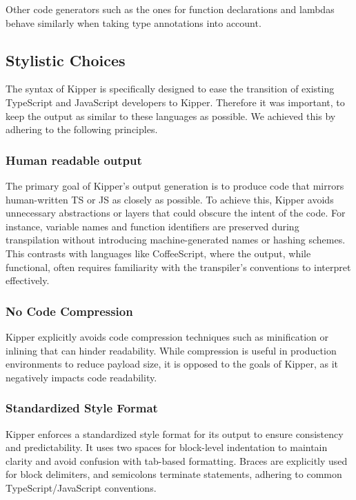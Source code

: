 Other code generators such as the ones for function declarations and lambdas behave similarly when taking type annotations into account.

\subsection{Stylistic Choices}

The syntax of Kipper is specifically designed to ease the transition of existing TypeScript and JavaScript developers to Kipper. Therefore it was important, to keep the output as similar to these languages as possible. We achieved this by adhering to the following principles.

\subsubsection{Human readable output}

The primary goal of Kipper's output generation is to produce code that mirrors human-written TS or JS as closely as possible. To achieve this, Kipper avoids unnecessary abstractions or layers that could obscure the intent of the code. For instance, variable names and function identifiers are preserved during \gls{transpilation} without introducing machine-generated names or hashing schemes. This contrasts with languages like CoffeeScript, where the output, while functional, often requires familiarity with the transpiler's conventions to interpret effectively.

\subsubsection{No Code Compression}

Kipper explicitly avoids code compression techniques such as minification or inlining that can hinder readability. While compression is useful in production environments to reduce payload size, it is opposed to the goals of Kipper, as it negatively impacts code readability.

\subsubsection{Standardized Style Format}

Kipper enforces a standardized style format for its output to ensure consistency and predictability. It uses two spaces for block-level indentation to maintain clarity and avoid confusion with tab-based formatting. Braces are explicitly used for block delimiters, and semicolons terminate statements, adhering to common TypeScript/JavaScript conventions.

